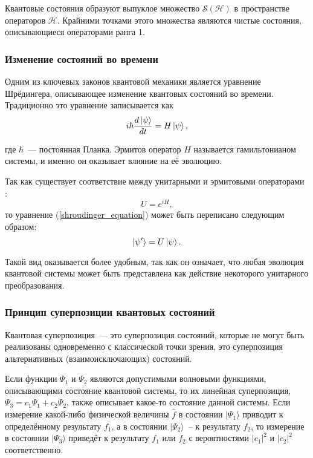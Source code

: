 Квантовые состояния образуют выпуклое множество $\mathcal{S}(\mathcal{H})$ в пространстве операторов $\mathcal{H}$. Крайними точками этого множества являются чистые состояния, описывающиеся операторами ранга 1.

\subsubsection{Изменение состояний во времени}
Одним из ключевых законов квантовой механики является уравнение Шрёдингера, описывающее изменение квантовых состояний во времени. Традиционно это уравнение записывается как 
\begin{equation}\label{shroudinger_equation}
  i \hbar \frac{d \left| \psi \right\rangle}{dt} = H \left| \psi \right\rangle, 
\end{equation}

где $\hbar$~--- постоянная Планка. Эрмитов оператор $H$ называется гамильтонианом системы, и именно он оказывает влияние на её эволюцию.

Так как существует соответствие между унитарными и эрмитовыми операторами \cite{nielsen_chuang}:
\begin{equation} U = e^{iH}, \end{equation}
то уравнение (\ref{shroudinger_equation}) может быть переписано следующим образом:
\begin{equation} \left| \psi' \right\rangle = U \left| \psi \right\rangle.\end{equation}

Такой вид оказывается более удобным, так как он означает, что любая эволюция квантовой системы может быть представлена как действие некоторого унитарного преобразования.

\subsubsection{Принцип суперпозиции квантовых состояний}
Квантовая суперпозиция~--- это суперпозиция состояний, которые не могут быть реализованы одновременно с классической точки зрения, это суперпозиция альтернативных (взаимоисключающих) состояний.

Если функции  $\Psi_1$ и $\Psi_2$ являются допустимыми волновыми функциями, описывающими состояние квантовой системы, то их линейная суперпозиция, $\Psi_3 = c_1\Psi_1 + c_2\Psi_2$, также описывает какое-то состояние данной системы. 
Если измерение какой-либо физической величины  $\hat f$ в состоянии  $|\Psi_1\rangle$ приводит к определённому результату $f_1$, а в состоянии  $|\Psi_2\rangle$~-- к результату $f_2$, то измерение в состоянии $|\Psi_3\rangle$ приведёт к результату $f_1$ или $f_2$ с вероятностями $|c_1|^2$ и $ |c_2|^2$ соответственно.


